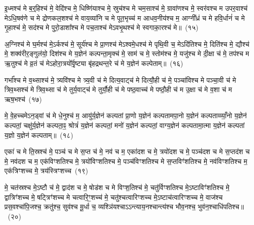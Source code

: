 {\anuvakamend[{ऋ॒तु॒ग्र॒हाश्च॒ चतु॑स्त्रिꣳशच्च}]}%

इ॒ध्मश्च॑ मे ब॒र्॒\mbox{}हिश्च॑ मे॒ वेदि॑श्च मे॒ धिष्णि॑याश्च मे॒ स्रुच॑श्च मे चम॒साश्च॑ मे॒ ग्रावा॑णश्च मे॒ स्वर॑वश्च म उपर॒वाश्च॑ मे\-ऽधि॒षव॑णे च मे द्रोणकल॒शश्च॑ मे वाय॒व्या॑नि च मे पूत॒भृच्च॑ म आधव॒नीय॑श्च म॒ आग्नी᳚ध्रं च मे हवि॒र्धानं॑ च मे गृ॒हाश्च॑ मे॒ सद॑श्च मे पुरो॒डाशा᳚श्च मे पच॒ताश्च॑ मे\-ऽवभृ॒थश्च॑ मे स्वगाका॒रश्च॑ मे॥~(१५)

{\anuvakamend[{गृ॒हाश्च॒ षोड॑श च}]}%

अ॒ग्निश्च॑ मे घ॒र्मश्च॑ मे॒\-ऽर्कश्च॑ मे॒ सूर्य॑श्च मे प्रा॒णश्च॑ मे\-ऽश्वमे॒धश्च॑ मे पृथि॒वी च॒ मे\-ऽदि॑तिश्च मे॒ दिति॑श्च मे॒ द्यौश्च॑ मे॒ शक्व॑रीर॒ङ्गुल॑यो॒ दिश॑श्च मे य॒ज्ञेन॑ कल्पन्ता॒मृक्च॑ मे॒ साम॑ च मे॒ स्तोम॑श्च मे॒ यजु॑श्च मे दी॒क्षा च॑ मे॒ तप॑श्च म ऋ॒तुश्च॑ मे व्र॒तं च॑ मे\-ऽहोरा॒त्रयो᳚र्वृ॒ष्ट्या बृ॑हद्रथन्त॒रे च॑ मे य॒ज्ञेन॑ कल्पेताम्॥~(१६)

{\anuvakamend[{दी॒क्षा\-ऽष्टाद॑श च}]}%

गर्भा᳚श्च मे व॒थ्साश्च॑ मे॒ त्र्यवि॑श्च मे त्र्य॒वी च॑ मे दित्य॒वाट्च॑ मे दित्यौ॒ही च॑ मे॒ पञ्चा॑विश्च मे पञ्चा॒वी च॑ मे त्रिव॒थ्सश्च॑ मे त्रिव॒थ्सा च॑ मे तुर्य॒वाट्च॑ मे तुर्यौ॒ही च॑ मे पष्ठ॒वाच्च॑ मे पष्ठौ॒ही च॑ म उ॒क्षा च॑ मे व॒शा च॑ म ऋष॒भश्च॑~(१७)

मे॒ वे॒हच्चमे\-ऽन॒ड्वां च॑ मे धे॒नुश्च॑ म॒ आयु॑र्य॒ज्ञेन॑ कल्पतां प्रा॒णो य॒ज्ञेन॑ कल्पतामपा॒नो य॒ज्ञेन॑ कल्पताव्व्याँ॒नो य॒ज्ञेन॑ कल्पतां॒ चक्षु॑र्य॒ज्ञेन॑ कल्पता॒ꣴ॒ श्रोत्रं॑ य॒ज्ञेन॑ कल्पतां॒ मनो॑ य॒ज्ञेन॑ कल्पतां॒ वाग्य॒ज्ञेन॑ कल्पतामा॒त्मा य॒ज्ञेन॑ कल्पतां य॒ज्ञो य॒ज्ञेन॑ कल्पताम्॥~(१८)

{\anuvakamend[{ऋ॒ष॒भश्च॑ चत्वारि॒ꣳ॒शच्च॑}]}%

एका॑ च मे ति॒स्रश्च॑ मे॒ पञ्च॑ च मे स॒प्त च॑ मे॒ नव॑ च म॒ एका॑\-दश च मे॒ त्रयो॑दश च मे॒ पञ्च॑दश च मे स॒प्तद॑श च मे॒ नव॑दश च म॒ एक॑विꣳशतिश्च मे॒ त्रयो॑विꣳशतिश्च मे॒ पञ्च॑विꣳशतिश्च मे स॒प्तविꣳ॑शतिश्च मे॒ नव॑विꣳशतिश्च म॒ एक॑त्रिꣳशच्च मे॒ त्रय॑स्त्रिꣳशच्च~(१९)

मे॒ चत॑स्रश्च मे॒\-ऽष्टौ च॑ मे॒ द्वाद॑श च मे॒ षोड॑श च मे विꣳश॒तिश्च॑ मे॒ चतु॑र्विꣳशतिश्च मे॒\-ऽष्टाविꣳ॑शतिश्च मे॒ द्वात्रिꣳ॑शच्च मे॒ षट्त्रिꣳ॑शच्च मे चत्वारि॒ꣳ॒शच्च॑ मे॒ चतु॑श्चत्वारिꣳशच्च मे॒\-ऽष्टाच॑त्वारिꣳशच्च मे॒ वाज॑श्च प्रस॒वश्चा॑पि॒जश्च॒ क्रतु॑श्च॒ सुव॑श्च मू॒र्धा च॒ व्यश्ञि॑यश्चा\-ऽऽ\-न्त्याय॒नश्चान्त्य॑श्च भौव॒नश्च॒ भुव॑न॒श्चाधि॑\-पतिश्च॥~(२०)

{\anuvakamend[{त्रय॑स्त्रिꣳशच्च॒ व्यश्ञि॑य॒ एका॑\-दश च}]}%

